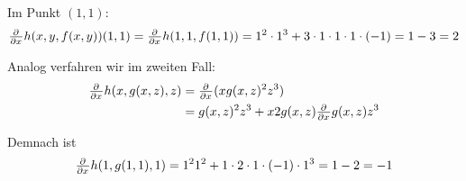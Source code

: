 \documentclass[a4paper,german,12pt,smallheadings]{scrartcl}
\begin{document}
\begin{enumerate}[(1)]
    Im Punkt $(1,1)$:
    \begin{align*}
      \pd{}{x} h(x,y,f(x,y))(1,1) = \pd{}{x} h(1,1,f(1,1)) = 1^2\cdot 1^3 + 3 \cdot 1 \cdot 1 \cdot 1 \cdot (-1) = 1-3 = 2
    \end{align*}

    Analog verfahren wir im zweiten Fall:
    \begin{align*}
      \pd{}{x}h(x,g(x,z),z) &= \pd{}{x}(xg(x,z)^2z^3) \\
                            &= g(x,z)^2z^3 + x2g(x,z) \pd{}{x} g(x,z) z^3
    \end{align*}

    Demnach ist
    \begin{align*}
      \pd{}{x} h(1,g(1,1),1) = 1^21^2 + 1 \cdot 2 \cdot 1 \cdot (-1) \cdot 1^3 = 1-2 = -1
    \end{align*}
\end{enumerate}
\end{document}
